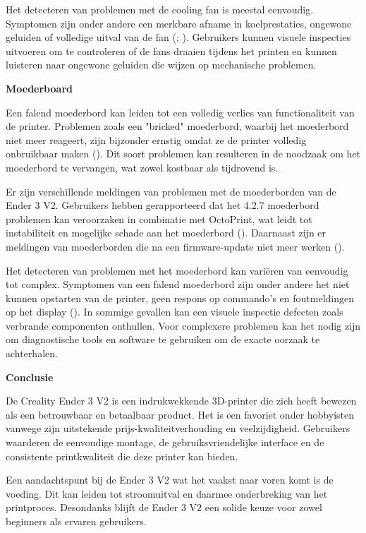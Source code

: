 \documentclass{article}
\begin{document}
Het detecteren van problemen met de cooling fan is meestal eenvoudig. Symptomen zijn onder andere een merkbare afname in koelprestaties, ongewone geluiden of volledige uitval van de fan (; ). Gebruikers kunnen visuele inspecties uitvoeren om te controleren of de fans draaien tijdens het printen en kunnen luisteren naar ongewone geluiden die wijzen op mechanische problemen.

\textbf{Moederboard}

Een falend moederbord kan leiden tot een volledig verlies van functionaliteit van de printer. Problemen zoals een "bricked" moederbord, waarbij het moederbord niet meer reageert, zijn bijzonder ernstig omdat ze de printer volledig onbruikbaar maken (). Dit soort problemen kan resulteren in de noodzaak om het moederbord te vervangen, wat zowel kostbaar als tijdrovend is.

Er zijn verschillende meldingen van problemen met de moederborden van de Ender 3 V2. Gebruikers hebben gerapporteerd dat het 4.2.7 moederbord problemen kan veroorzaken in combinatie met OctoPrint, wat leidt tot instabiliteit en mogelijke schade aan het moederbord (). Daarnaast zijn er meldingen van moederborden die na een firmware-update niet meer werken ().

Het detecteren van problemen met het moederbord kan variëren van eenvoudig tot complex. Symptomen van een falend moederbord zijn onder andere het niet kunnen opstarten van de printer, geen respons op commando's en foutmeldingen op het display (). In sommige gevallen kan een visuele inspectie defecten zoals verbrande componenten onthullen. Voor complexere problemen kan het nodig zijn om diagnostische tools en software te gebruiken om de exacte oorzaak te achterhalen.

\textbf{Conclusie}

De Creality Ender 3 V2 is een indrukwekkende 3D-printer die zich heeft bewezen als een betrouwbaar en betaalbaar product. Het is een favoriet onder hobbyisten vanwege zijn uitstekende prijs-kwaliteitverhouding en veelzijdigheid. Gebruikers waarderen de eenvoudige montage, de gebruiksvriendelijke interface en de consistente printkwaliteit die deze printer kan bieden.

Een aandachtspunt bij de Ender 3 V2 wat het vaakst naar voren komt is de voeding. Dit kan leiden tot stroomuitval en daarmee onderbreking van het printproces. Desondanks blijft de Ender 3 V2 een solide keuze voor zowel beginners als ervaren gebruikers.
\end{document}
